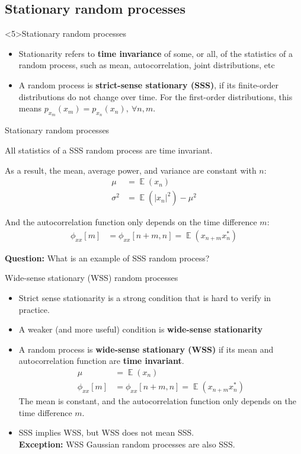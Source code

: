 \documentclass[10pt]{beamer}
\DeclareMathOperator{\E}{\mathbb{E}} %
\begin{document}
\subsection{Stationary random processes}
\begin{frame}<5>{Stationary random processes}
\begin{itemize}
	\item Stationarity refers to \textbf{time invariance} of some, or all, of the statistics of a random process, such as mean, autocorrelation, joint distributions, etc
	\item A random process is \textbf{strict-sense stationary (SSS)}, if its finite-order distributions do not change over time. For the first-order distributions, this means $p_{x_m}(x_m) = p_{x_n}(x_n),~\forall n, m$.
\end{itemize}
 
\centering
\resizebox{0.7\linewidth}{!}{}
\end{frame}

\begin{frame}{Stationary random processes}

All statistics of a SSS random process are time invariant. 

As a result, the mean, average power, and variance are constant with $n$:
\begin{align*}
\mu &= \E(x_n) \\
\sigma^2 &= \E(|x_n|^2) - \mu^2
\end{align*}

And the autocorrelation function only depends on the time difference $m$:
\begin{align*}
\phi_{xx}[m] &= \phi_{xx}[n+m, n] = \E(x_{n+m}x_n^*)
\end{align*}

\textbf{Question:} What is an example of SSS random process?

\end{frame}

\begin{frame}{Wide-sense stationary (WSS) random processes}

\begin{itemize}
	\item Strict sense stationarity is a strong condition that is hard to verify in practice.
	\pause\item A weaker (and more useful) condition is \textbf{wide-sense stationarity}
	\pause\item A random process is \textbf{wide-sense stationary (WSS)} if its mean and autocorrelation function are \textbf{time invariant}. 
	\begin{align*}
	\mu &= \E(x_n) \\
	\phi_{xx}[m] &= \phi_{xx}[n+m, n] = \E(x_{n+m}x_n^*)
	\end{align*}
	The mean is constant, and the autocorrelation function only depends on the time difference $m$.
	\pause\item SSS implies WSS, but WSS does not mean SSS. \\
	\textbf{Exception:} WSS Gaussian random processes are also SSS.	
\end{itemize}
\end{frame}
\end{document}
